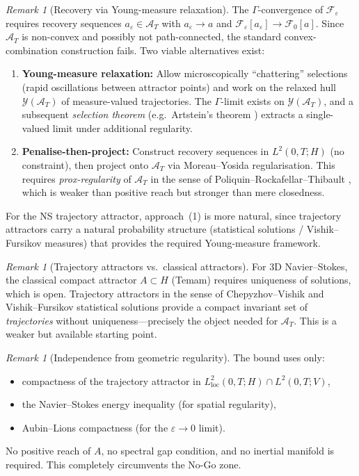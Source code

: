 \documentclass[12pt,a4paper]{article}
\theoremstyle{definition}
\theoremstyle{plain}
\theoremstyle{remark}
\newtheorem{remark}[definition]{Remark}
\begin{document}
\begin{remark}[Recovery via Young-measure relaxation]\label{rem:young-measure}
The $\Gamma$-convergence of $\mathcal{F}_\varepsilon$ requires recovery sequences $a_\varepsilon \in \mathcal{A}_T$ with $a_\varepsilon \to a$ and $\mathcal{F}_\varepsilon[a_\varepsilon] \to \mathcal{F}_0[a]$. Since $\mathcal{A}_T$ is non-convex and possibly not path-connected, the standard convex-combination construction fails. Two viable alternatives exist:
\begin{enumerate}
\item \textbf{Young-measure relaxation:} Allow microscopically ``chattering'' selections (rapid oscillations between attractor points) and work on the relaxed hull $\mathcal{Y}(\mathcal{A}_T)$ of measure-valued trajectories. The $\Gamma$-limit exists on $\mathcal{Y}(\mathcal{A}_T)$, and a subsequent \emph{selection theorem} (e.g.\ Artstein's theorem \cite{Artstein1995}) extracts a single-valued limit under additional regularity.
\item \textbf{Penalise-then-project:} Construct recovery sequences in $L^2(0,T;H)$ (no constraint), then project onto $\mathcal{A}_T$ via Moreau--Yosida regularisation. This requires \emph{prox-regularity} of $\mathcal{A}_T$ in the sense of Poliquin--Rockafellar--Thibault \cite{PoliquinRockafellarThibault2000}, which is weaker than positive reach but stronger than mere closedness.
\end{enumerate}
For the NS trajectory attractor, approach~(1) is more natural, since trajectory attractors carry a natural probability structure (statistical solutions / Vishik--Fursikov measures) that provides the required Young-measure framework.
\end{remark}

\begin{remark}[Trajectory attractors vs.\ classical attractors]\label{rem:trajectory-attractor}
For 3D Navier--Stokes, the classical compact attractor $A \subset H$ (Temam) requires uniqueness of solutions, which is open. Trajectory attractors in the sense of Chepyzhov--Vishik \cite{ChepyzhovVishik2002} and Vishik--Fursikov statistical solutions provide a compact invariant set of \emph{trajectories} without uniqueness---precisely the object needed for $\mathcal{A}_T$. This is a weaker but available starting point.
\end{remark}

\begin{remark}[Independence from geometric regularity]\label{rem:no-reach-needed}
The bound uses only:
\begin{itemize}
\item compactness of the trajectory attractor in $L^2_{\mathrm{loc}}(0,T;H) \cap L^2(0,T;V)$,
\item the Navier--Stokes energy inequality (for spatial regularity),
\item Aubin--Lions compactness (for the $\varepsilon \to 0$ limit).
\end{itemize}
No positive reach of $A$, no spectral gap condition, and no inertial manifold is required. This completely circumvents the No-Go zone.
\end{remark}
\end{document}
